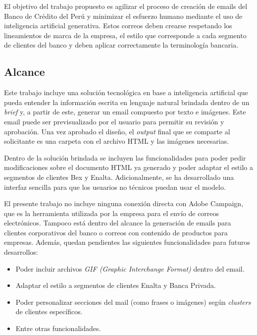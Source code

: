 El objetivo del trabajo propuesto es agilizar el proceso de creación de emails del Banco de Crédito del Perú y minimizar el esfuerzo humano mediante el uso de inteligencia artificial generativa. Estos correos deben crearse respetando los lineamientos de marca de la empresa, el estilo que corresponde a cada segmento de clientes del banco y deben aplicar correctamente la terminología bancaria.

\subsection{Alcance}

Este trabajo incluye una solución tecnológica en base a inteligencia artificial que pueda entender la información escrita en lenguaje natural brindada dentro de un \textit{brief} y, a partir de este, generar un email compuesto por texto e imágenes. Este email puede ser previsualizado por el usuario para permitir su revisión y aprobación. Una vez aprobado el diseño, el \textit{output} final que se comparte al solicitante es una carpeta con el archivo HTML y las imágenes necesarias.

Dentro de la solución brindada se incluyen las funcionalidades para poder pedir modificaciones sobre el documento HTML ya generado y poder adaptar el estilo a segmentos de clientes Bex y Enalta. Adicionalmente, se ha desarrollado una interfaz sencilla para que los usuarios no técnicos puedan usar el modelo.

El presente trabajo no incluye ninguna conexión directa con Adobe Campaign, que es la herramienta utilizada por la empresa para el envío de correos electrónicos. Tampoco está dentro del alcance la generación de emails para clientes corporativos del banco o correos con contenido de productos para empresas. Además, quedan pendientes las siguientes funcionalidades para futuros desarrollos: 

\begin{itemize}
    \item Poder incluir archivos \textit{GIF (Graphic Interchange Format)} dentro del email.
    \item Adaptar el estilo a segmentos de clientes Enalta y Banca Privada.
    \item Poder personalizar secciones del mail (como frases o imágenes) según \textit{clusters} de clientes específicos.
    \item Entre otras funcionalidades.
\end{itemize}

